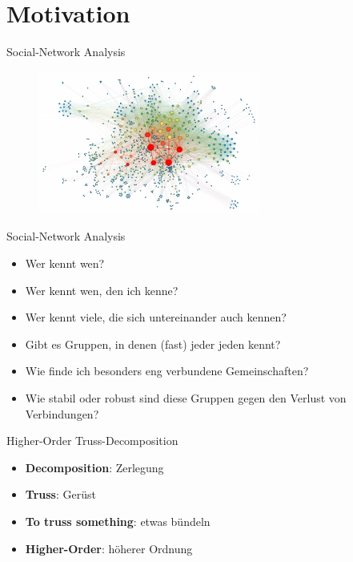 \section*{Motivation}

\begin{frame}{Social-Network Analysis}
    \begin{figure}[h]
        \centering
        \includegraphics[width=0.65\textwidth]{imglib/social-network-analysis}\\
        \label{fig:social-network-analysis}
    \end{figure}
\end{frame}

\begin{frame}{Social-Network Analysis}
    \begin{itemize}
        \item Wer kennt wen?
        \item Wer kennt wen, den ich kenne?
        \item Wer kennt viele, die sich untereinander auch kennen?
        \item Gibt es Gruppen, in denen (fast) jeder jeden kennt?
        \item Wie finde ich besonders eng verbundene Gemeinschaften?
        \item Wie stabil oder robust sind diese Gruppen gegen den Verlust von Verbindungen?
    \end{itemize}
\end{frame}

\begin{frame}{Higher-Order Truss-Decomposition}
    \begin{itemize}
        \item \textbf{Decomposition}: Zerlegung
        \item \textbf{Truss}: Gerüst
        \item \textbf{To truss something}: etwas bündeln
        \item \textbf{Higher-Order}: höherer Ordnung
    \end{itemize}
\end{frame}

